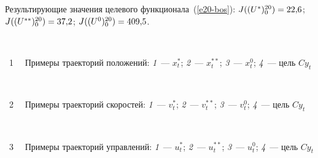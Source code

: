 \begin{multicols}{2}
    

     
     Результирующие значения целевого функционала~(\ref{e20-bos}): 
$J((U^*)_0^{20})\hm= 22{,}6$; $J((U^{**})_0^{20})\hm= 37{,}2$; $J((U^0)_0^{20})\hm= 409{,}5$.

{ \begin{center}  %
 \vspace*{12pt}
   \mbox{%
\epsfxsize=78mm
}

\end{center}

\noindent
{{\figurename~1}\ \ \small{
Примеры траекторий положений: \textit{1}~--- $x_t^*$; \textit{2}~--- $x_t^{**}$; 
\textit{3}~--- $x_t^0$; \textit{4}~--- цель $C y_t$
}}}




{ \begin{center}  %
 \vspace*{3pt}
    \mbox{%
\epsfxsize=78mm
}

\end{center}


\noindent
{{\figurename~2}\ \ \small{
Примеры траекторий скоростей: \textit{1}~--- $v_t^*$; \textit{2}~--- $v_t^{**}$; 
\textit{3}~--- $v_t^0$; \textit{4}~--- цель $C y_t$
}}}

\vspace*{9pt}

{ \begin{center}  %
 \vspace*{3pt}
   \mbox{%
\epsfxsize=78mm
}

\end{center}



\noindent
{{\figurename~3}\ \ \small{
Примеры траекторий управлений: 
\textit{1}~--- $u_t^*$; \textit{2}~--- $u_t^{**}$; \textit{3}~--- $u_t^0$; \textit{4}~--- цель $C 
y_t$
}}}

\vspace*{9pt}



{ \begin{center}  %
 \vspace*{-3pt}
     \mbox{%
\epsfxsize=78.952mm
}


\end{center}}
\end{multicols}
